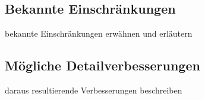 \documentclass[12pt,halfparskip]{scrartcl}
\begin{document}
\subsection{Bekannte Einschränkungen} %
\label{sub:bekannte_einschränkungen}
bekannte Einschränkungen erwähnen und erläutern
\subsection{Mögliche Detailverbesserungen} %
\label{sub:mögliche_detailverbesserungen}
daraus resultierende Verbesserungen beschreiben
\end{document}
